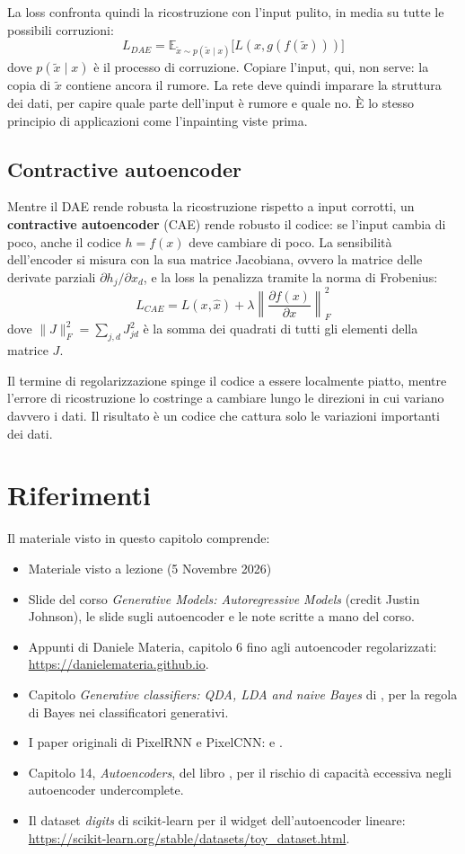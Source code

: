 La loss confronta quindi la ricostruzione con l'input pulito, in media su tutte le possibili corruzioni:
\[
    L_{DAE} = \mathbb{E}_{\tilde{x} \sim p(\tilde{x} \mid x)} \big[ L(x, g(f(\tilde{x}))) \big]
\]
dove $p(\tilde{x} \mid x)$ è il processo di corruzione. Copiare l'input, qui, non serve: la copia di $\tilde{x}$ contiene ancora il rumore. La rete deve quindi imparare la struttura dei dati, per capire quale parte dell'input è rumore e quale no. È lo stesso principio di applicazioni come l'inpainting viste prima.

\subsection{Contractive autoencoder}
Mentre il DAE rende robusta la ricostruzione rispetto a input corrotti, un \textbf{contractive autoencoder} (CAE) rende robusto il codice: se l'input cambia di poco, anche il codice $h = f(x)$ deve cambiare di poco. La sensibilità dell'encoder si misura con la sua matrice Jacobiana, ovvero la matrice delle derivate parziali $\partial h_j / \partial x_d$, e la loss la penalizza tramite la norma di Frobenius:
\[
    L_{CAE} = L(x, \hat{x}) + \lambda \left\| \frac{\partial f(x)}{\partial x} \right\|_F^2
\]
dove $\|J\|_F^2 = \sum_{j,d} J_{jd}^2$ è la somma dei quadrati di tutti gli elementi della matrice $J$.

Il termine di regolarizzazione spinge il codice a essere localmente piatto, mentre l'errore di ricostruzione lo costringe a cambiare lungo le direzioni in cui variano davvero i dati. Il risultato è un codice che cattura solo le variazioni importanti dei dati.

\section*{Riferimenti}
Il materiale visto in questo capitolo comprende:
\begin{itemize}
    \item Materiale visto a lezione (5 Novembre 2026)
    \item Slide del corso \emph{Generative Models: Autoregressive Models} (credit Justin Johnson), le slide sugli autoencoder e le note scritte a mano del corso.
    \item Appunti di Daniele Materia, capitolo 6 fino agli autoencoder regolarizzati: \url{https://danielemateria.github.io}.
    \item Capitolo \emph{Generative classifiers: QDA, LDA and naive Bayes} di \cite{Furnari-FAD}, per la regola di Bayes nei classificatori generativi.
    \item I paper originali di PixelRNN e PixelCNN:  \cite{vandenOord2016-PixelRNN} e  \cite{vandenOord2016-PixelCNN}.
    \item Capitolo 14, \emph{Autoencoders}, del libro  \cite{Goodfellow-et-al-2016}, per il rischio di capacità eccessiva negli autoencoder undercomplete.
    \item Il dataset \emph{digits} di scikit-learn per il widget dell'autoencoder lineare: \url{https://scikit-learn.org/stable/datasets/toy_dataset.html}.
\end{itemize}